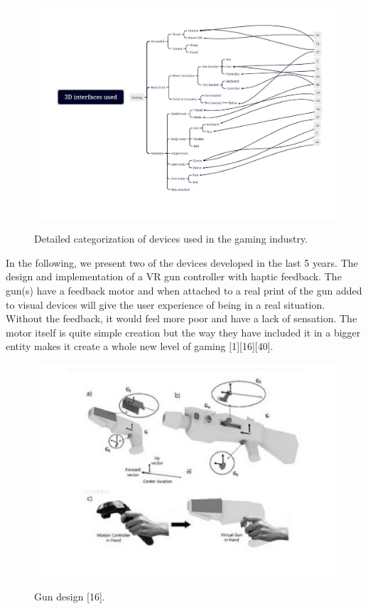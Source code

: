 \begin{figure}[htbp]
	\includegraphics[width=\linewidth]{figures/gaming.pdf}
	\label{fig:gaming}
	\caption{Detailed categorization of devices used in the gaming industry.}
\end{figure}
 
In the following, we present two of the devices developed in the last 5 years. 
The design and implementation of a VR gun controller with haptic feedback. The gun(s) have a feedback motor and when attached to a real print of the gun added to visual devices will give the user experience of being in a real situation. Without the feedback, it would feel more poor and have a lack of sensation. The motor itself is quite simple creation but the way they have included it in a bigger entity makes it create a whole new level of gaming [1][16][40].

\begin{figure}[!htbp]
	\includegraphics[width=\linewidth]{figures/gun.pdf}
	\label{fig:gun}
	\caption{Gun design [16].}
\end{figure}


